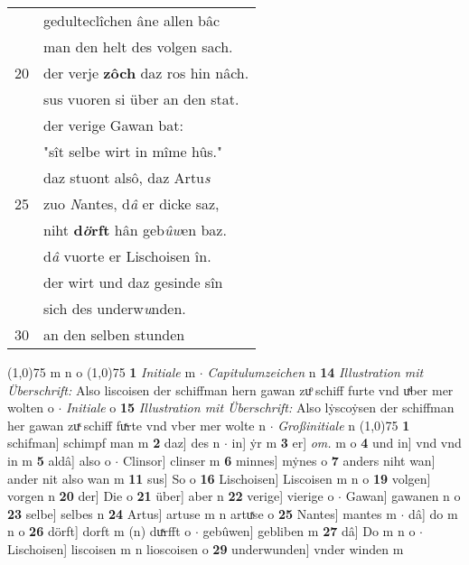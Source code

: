 \documentclass[8pt,a4paper,notitlepage]{article}
\begin{document}
\begin{table}[ht]
\begin{minipage}[t]{0.5\linewidth}
\begin{tabular}{rl}
 & gedulteclîchen âne allen bâc\\ 
 & man den helt des volgen sach.\\ 
20 & der verje \textbf{zôch} daz ros hin nâch.\\ 
 & sus vuoren si über an den stat.\\ 
 & der verige Gawan bat:\\ 
 & "sît selbe wirt in mîme hûs."\\ 
 & daz stuont alsô, daz Artu\textit{s}\\ 
25 & zuo \textit{N}antes, d\textit{â} er dicke saz,\\ 
 & niht \textbf{d\textit{ö}rft} hân geb\textit{ûw}en baz.\\ 
 & d\textit{â} vuorte er Lischoisen în.\\ 
 & der wirt und daz gesinde sîn\\ 
 & sich des underw\textit{u}nden.\\ 
30 & an den selben stunden\\ 
\end{tabular}
\scriptsize
\line(1,0){75} \newline
m n o \newline
\line(1,0){75} \newline
\textbf{1} \textit{Initiale} m   $\cdot$ \textit{Capitulumzeichen} n  \textbf{14} \textit{Illustration mit Überschrift:} Also liscoisen der schiffman hern gawan zuͦ schiff furte vnd uͯber mer wolten o   $\cdot$ \textit{Initiale} o  \textbf{15} \textit{Illustration mit Überschrift:} Also lẏscoẏsen der schiffman her gawan zuͯ schiff fuͯrte vnd vber mer wolte n   $\cdot$ \textit{Großinitiale} n  \newline
\line(1,0){75} \newline
\textbf{1} schifman] schimpf man m \textbf{2} daz] des n  $\cdot$ in] ẏr m \textbf{3} er] \textit{om.} m o \textbf{4} und in] vnd vnd in m \textbf{5} aldâ] also o  $\cdot$ Clinsor] clinser m \textbf{6} minnes] mẏnes o \textbf{7} anders niht wan] ander nit also wan m \textbf{11} sus] So o \textbf{16} Lischoisen] Liscoisen m n o \textbf{19} volgen] vorgen n \textbf{20} der] Die o \textbf{21} über] aber n \textbf{22} verige] vierige o  $\cdot$ Gawan] gawanen n o \textbf{23} selbe] selbes n \textbf{24} Artus] artuse m n artuͯse o \textbf{25} Nantes] mantes m  $\cdot$ dâ] do m n o \textbf{26} dörft] dorft m (n) duͯrfft o  $\cdot$ gebûwen] gebliben m \textbf{27} dâ] Do m n o  $\cdot$ Lischoisen] liscoisen m n lioscoisen o \textbf{29} underwunden] vnder winden m \newline
\end{minipage}
\end{table}
\end{document}
